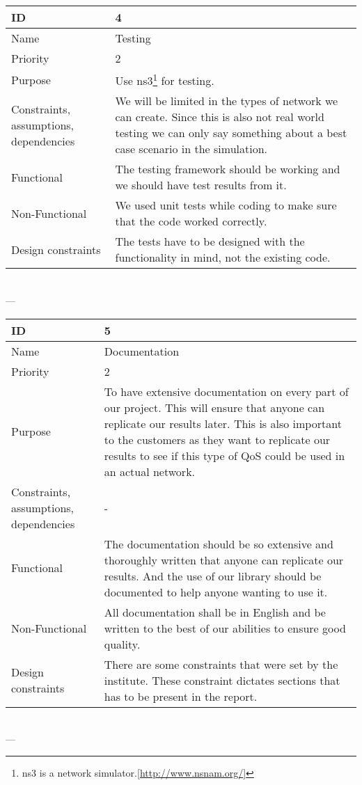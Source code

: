 \begin{center}
    \begin{tabular}{| p{4cm} | p{8cm} |}
        \hline
        ID & 4 \\
        \hline
        Name & Testing  \\
        \hline
        Priority & 2 \\
        \hline
        Purpose & Use \gls{ns3}\footnote{\gls{ns3} is a network simulator.[\url{http://www.nsnam.org/}]} for testing. \\
        \hline 
        Constraints, assumptions, dependencies & We will be limited in the types of network we can create. Since this is also not real world testing we can only say something about a best case scenario in the simulation.\\
        \hline  
        Functional & The testing framework should be working and we should have test results from it.\\
        \hline
        Non-Functional & We used unit tests while coding to make sure that the code worked correctly. \\ 
        \hline
        Design constraints & The tests have to be designed with the functionality in mind, not the existing code. \\
        \hline
    \end{tabular}
    \\  ---  \\
    
    \begin{tabular}{| p{4cm} | p{8cm} |}
        \hline
        ID & 5 \\
        \hline
        Name & Documentation  \\
        \hline
        Priority & 2 \\
        \hline
        Purpose & To have extensive documentation on every part of our project. This will ensure that anyone can replicate our results later. This is also important to the customers as they want to replicate our results to see if this type of QoS could be used in an actual network.\\
        \hline 
        Constraints, assumptions, dependencies & -\\
        \hline  
        Functional & The documentation should be so extensive and thoroughly written that anyone can replicate our results. And the use of our library should be documented to help anyone wanting to use it. \\
        \hline
        Non-Functional & All documentation shall be in English and be written to the best of our abilities to ensure good quality. \\ 
        \hline
        Design constraints & There are some constraints that were set by the institute. These constraint dictates sections that has to be present in the report. \\
        \hline
    \end{tabular}
    \\  ---  \\
    

\end{center}
